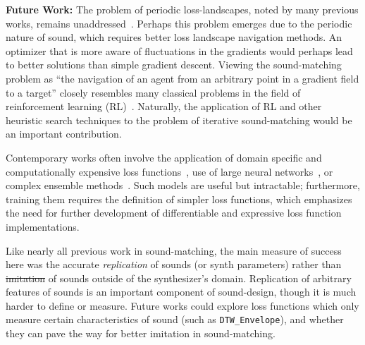 \documentclass[lettersize,journal]{IEEEtran}
\makeatletter
\newcommand{\DTWEnv}{\texttt{DTW\_Envelope}}
\providecommand{\DIFadd}[1]{{\protect\color{blue}\uwave{#1}}} %
\providecommand{\DIFdel}[1]{{\protect\color{red}\sout{#1}}} %
\providecommand{\DIFaddbegin}{} %
\providecommand{\DIFaddend}{} %
\providecommand{\DIFdelbegin}{} %
\providecommand{\DIFdelend}{} %
\providecommand{\DIFscaledelfig}{0.5}
\newlength{\DIFdelgraphicswidth} %
\newlength{\DIFdelgraphicsheight} %
\providecommand{\DIFaddincludegraphics}[2][]{{\color{blue}\fbox{\DIFOincludegraphics[#1]{#2}}}} %
\providecommand{\DIFdelincludegraphics}[2][]{%
\sbox{\DIFdelgraphicsbox}{\DIFOincludegraphics[#1]{#2}}%
\settoboxwidth{\DIFdelgraphicswidth}{\DIFdelgraphicsbox} %
\settoboxtotalheight{\DIFdelgraphicsheight}{\DIFdelgraphicsbox} %
\scalebox{\DIFscaledelfig}{%
\parbox[b]{\DIFdelgraphicswidth}{\usebox{\DIFdelgraphicsbox}\\[-\baselineskip] \rule{\DIFdelgraphicswidth}{0em}}\llap{\resizebox{\DIFdelgraphicswidth}{\DIFdelgraphicsheight}{%
\setlength{\unitlength}{\DIFdelgraphicswidth}%
\begin{picture}(1,1)%
\thicklines\linethickness{2pt} %
{\color[rgb]{1,0,0}\put(0,0){\framebox(1,1){}}}%
{\color[rgb]{1,0,0}\put(0,0){\line( 1,1){1}}}%
{\color[rgb]{1,0,0}\put(0,1){\line(1,-1){1}}}%
\end{picture}%
}\hspace*{3pt}}} %
} %
\DeclareRobustCommand{\DIFaddbegin}{\DIFOaddbegin \let\includegraphics\DIFaddincludegraphics} %
\DeclareRobustCommand{\DIFaddend}{\DIFOaddend \let\includegraphics\DIFOincludegraphics} %
\DeclareRobustCommand{\DIFdelbegin}{\DIFOdelbegin \let\includegraphics\DIFdelincludegraphics} %
\DeclareRobustCommand{\DIFdelend}{\DIFOaddend \let\includegraphics\DIFOincludegraphics} %
\let\sout@orig\sout %
\renewcommand{\sout}[1]{\ifmmode\text{\sout@orig{\ensuremath{#1}}}\else\sout@orig{#1}\fi} %
\makeatother
\begin{document}
\label{sec:future}
\textbf{Future Work: } The problem of periodic loss-landscapes, noted by many previous works, remains unaddressed~\cite{turian2020sorry,vahidi2023mesostructures,uzrad2024diffmoog,bruford2024synthesizer}. Perhaps this problem emerges due to the periodic nature of sound, which requires better loss landscape navigation methods. An optimizer that is more aware of fluctuations in the gradients would perhaps lead to better solutions than simple gradient descent. Viewing the sound-matching problem as ``the navigation of an agent from an arbitrary point in a gradient field to a target'' closely resembles many classical problems in the field of reinforcement learning (RL)~\cite{sutton2018reinforcement}. Naturally, the application of RL and other heuristic search techniques to the problem of iterative sound-matching would be an important contribution.

Contemporary works often involve the application of domain specific and computationally expensive loss functions~\cite{han2023perceptual,uzrad2024diffmoog}, use of large neural networks~\cite{hershey2017cnn,cramer2019look}, or complex ensemble methods~\cite{turian2022hear}. Such models are useful but intractable; furthermore, training them requires the definition of simpler loss functions, which emphasizes the need for further development of differentiable and expressive loss function implementations. 

Like nearly all previous work in sound-matching, the main measure of success here was the accurate \textit{replication} of sounds (or synth\DIFaddbegin \DIFadd{esizer}\DIFaddend{}  parameters) rather than \DIFdelbegin \DIFdel{imitation }\DIFdelend \DIFaddbegin \textit{\DIFadd{imitation}} \DIFaddend of sounds outside of the synthesizer's domain. Replication of arbitrary features of sounds is an important component of sound-design, though it is much harder to define or measure. Future works could explore loss functions which only measure certain characteristics of sound (such as \DTWEnv), and whether they can pave the way for better imitation in sound-matching.


\DIFdelbegin %
\DIFdelend %

\DIFaddbegin 

 \DIFaddend
\end{document}
